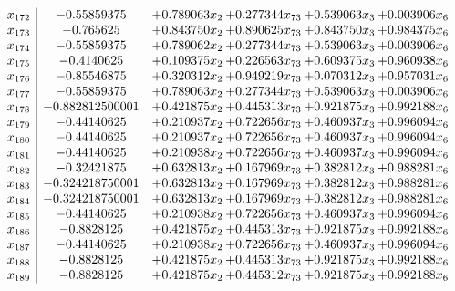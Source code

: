 \documentclass[11pt]{article}
\begin{document}
\[\begin{array}{c| c c@{\hskip 2pt} c@{\hskip 2pt} c@{\hskip 2pt} c@{\hskip 2pt} }
 x_{172}   &  -0.55859375 & + 0.789063 x_{2} & + 0.277344 x_{73} & + 0.539063 x_{3} & + 0.003906 x_{6}\\
 x_{173}   &  -0.765625 & + 0.843750 x_{2} & + 0.890625 x_{73} & + 0.843750 x_{3} & + 0.984375 x_{6}\\
 x_{174}   &  -0.55859375 & + 0.789062 x_{2} & + 0.277344 x_{73} & + 0.539063 x_{3} & + 0.003906 x_{6}\\
 x_{175}   &  -0.4140625 & + 0.109375 x_{2} & + 0.226563 x_{73} & + 0.609375 x_{3} & + 0.960938 x_{6}\\
 x_{176}   &  -0.85546875 & + 0.320312 x_{2} & + 0.949219 x_{73} & + 0.070312 x_{3} & + 0.957031 x_{6}\\
 x_{177}   &  -0.55859375 & + 0.789063 x_{2} & + 0.277344 x_{73} & + 0.539063 x_{3} & + 0.003906 x_{6}\\
 x_{178}   &  -0.882812500001 & + 0.421875 x_{2} & + 0.445313 x_{73} & + 0.921875 x_{3} & + 0.992188 x_{6}\\
 x_{179}   &  -0.44140625 & + 0.210937 x_{2} & + 0.722656 x_{73} & + 0.460937 x_{3} & + 0.996094 x_{6}\\
 x_{180}   &  -0.44140625 & + 0.210937 x_{2} & + 0.722656 x_{73} & + 0.460937 x_{3} & + 0.996094 x_{6}\\
 x_{181}   &  -0.44140625 & + 0.210938 x_{2} & + 0.722656 x_{73} & + 0.460937 x_{3} & + 0.996094 x_{6}\\
 x_{182}   &  -0.32421875 & + 0.632813 x_{2} & + 0.167969 x_{73} & + 0.382812 x_{3} & + 0.988281 x_{6}\\
 x_{183}   &  -0.324218750001 & + 0.632813 x_{2} & + 0.167969 x_{73} & + 0.382812 x_{3} & + 0.988281 x_{6}\\
 x_{184}   &  -0.324218750001 & + 0.632813 x_{2} & + 0.167969 x_{73} & + 0.382812 x_{3} & + 0.988281 x_{6}\\
 x_{185}   &  -0.44140625 & + 0.210938 x_{2} & + 0.722656 x_{73} & + 0.460937 x_{3} & + 0.996094 x_{6}\\
 x_{186}   &  -0.8828125 & + 0.421875 x_{2} & + 0.445313 x_{73} & + 0.921875 x_{3} & + 0.992188 x_{6}\\
 x_{187}   &  -0.44140625 & + 0.210938 x_{2} & + 0.722656 x_{73} & + 0.460937 x_{3} & + 0.996094 x_{6}\\
 x_{188}   &  -0.8828125 & + 0.421875 x_{2} & + 0.445313 x_{73} & + 0.921875 x_{3} & + 0.992188 x_{6}\\
 x_{189}   &  -0.8828125 & + 0.421875 x_{2} & + 0.445312 x_{73} & + 0.921875 x_{3} & + 0.992188 x_{6}\\

\end{array}\]
\end{document}

